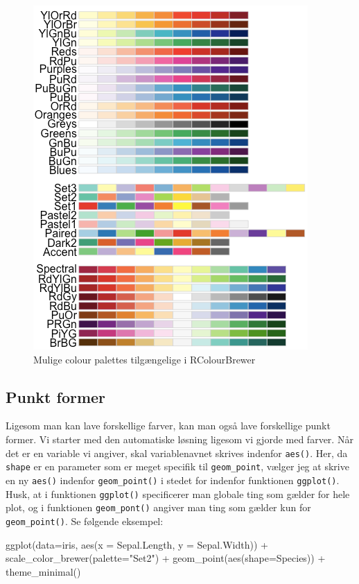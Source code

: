 \documentclass[
]{book}
\newenvironment{Shaded}{\begin{snugshade}}{\end{snugshade}}
\newcommand{\AttributeTok}[1]{\textcolor[rgb]{0.77,0.63,0.00}{#1}}
\newcommand{\FunctionTok}[1]{\textcolor[rgb]{0.00,0.00,0.00}{#1}}
\newcommand{\NormalTok}[1]{#1}
\newcommand{\SpecialCharTok}[1]{\textcolor[rgb]{0.00,0.00,0.00}{#1}}
\newcommand{\StringTok}[1]{\textcolor[rgb]{0.31,0.60,0.02}{#1}}
\begin{document}
\begin{figure}
\centering
\includegraphics{plots/rcolorbrewer.png}
\caption{Mulige colour palettes tilgængelige i RColourBrewer}
\end{figure}

\hypertarget{punkt-former}{%
\subsection{Punkt former}\label{punkt-former}}

Ligesom man kan lave forskellige farver, kan man også lave forskellige punkt former. Vi starter med den automatiske løsning ligesom vi gjorde med farver. Når det er en variable vi angiver, skal variablenavnet skrives indenfor \texttt{aes()}. Her, da \texttt{shape} er en parameter som er meget specifik til \texttt{geom\_point}, vælger jeg at skrive en ny \texttt{aes()} indenfor \texttt{geom\_point()} i stedet for indenfor funktionen \texttt{ggplot()}. Husk, at i funktionen \texttt{ggplot()} specificerer man globale ting som gælder for hele plot, og i funktionen \texttt{geom\_pont()} angiver man ting som gælder kun for \texttt{geom\_point()}. Se følgende eksempel:

\begin{Shaded}
\begin{Highlighting}[]
\FunctionTok{ggplot}\NormalTok{(}\AttributeTok{data=}\NormalTok{iris, }\FunctionTok{aes}\NormalTok{(}\AttributeTok{x =}\NormalTok{ Sepal.Length, }\AttributeTok{y =}\NormalTok{ Sepal.Width)) }\SpecialCharTok{+}
  \FunctionTok{scale\_color\_brewer}\NormalTok{(}\AttributeTok{palette=}\StringTok{"Set2"}\NormalTok{) }\SpecialCharTok{+}
  \FunctionTok{geom\_point}\NormalTok{(}\FunctionTok{aes}\NormalTok{(}\AttributeTok{shape=}\NormalTok{Species)) }\SpecialCharTok{+} 
  \FunctionTok{theme\_minimal}\NormalTok{()}
\end{Highlighting}
\end{Shaded}
\end{document}
